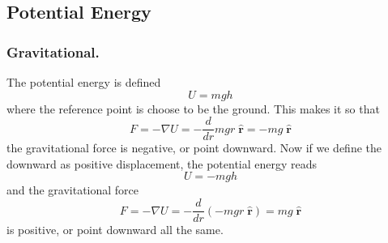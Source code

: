 \documentclass[../../../main.tex]{subfiles}
\begin{document}
\subsection*{Potential Energy}
\subsubsection*{Gravitational.} 
The potential energy is defined 
\begin{equation*}
    U=mgh
\end{equation*}
where the reference point is choose to be the ground.
This makes it so that 
\begin{equation*}
    F=-\nabla U=-\frac{d}{dr}mgr\;\mathbf{\hat{r}}=-mg\;\mathbf{\hat{r}}
\end{equation*}
the gravitational force is negative, or point downward.
Now if we define the downward as positive displacement, the potential energy reads
\begin{equation*}
    U=-mgh
\end{equation*}
and the gravitational force
\begin{equation*}
    F=-\nabla U=-\frac{d}{dr}\left(-mgr\;\mathbf{\hat{r}}\right)=mg\;\mathbf{\hat{r}} 
\end{equation*}
is positive, or point downward all the same.
\end{document}
